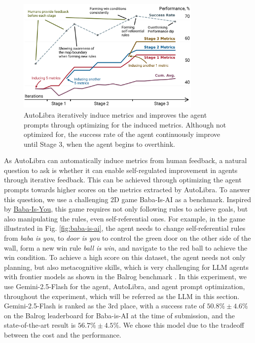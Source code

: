 \documentclass[../main.tex]{subfiles}
\begin{document}

\begin{figure}[!b]
	\centering
	\includegraphics[width=0.8\textwidth]{figs/running_maximum_plot.pdf}
	\caption{AutoLibra iteratively induce metrics and improves the agent prompts
	through optimizing for the induced metrics. Although not optimized for, the
	success rate of the agent continuously improve until Stage 3, when the agent begins
	to overthink.}
	\label{fig:autolibra_self_improving}
\end{figure}

As AutoLibra can automatically induce metrics from human feedback, a natural
question to ask is whether it can enable self-regulated improvement in agents
through iterative feedback. This can be achieved through optimizing the agent prompts
towards higher scores on the metrics extracted by AutoLibra. To answer this
question, we use a challenging 2D game Baba-Is-AI \citep{cloos2024babaaibreakrules, paglieri2024balrog}
as a benchmark. Inspired by \href{https://hempuli.com/baba/}{Baba-Is-You}, this
game requires not only following rules to achieve goals, but also manipulating the
rules, even self-referential ones. For example, in the game illustrated in Fig.
\ref{fig:baba-is-ai}, the agent needs to change self-referential rules from \textsl{baba
is you}, to \textsl{door is you} to control the green door on the other side of
the wall, form a new win rule \textsl{ball is win}, and navigate to the red ball
to achieve the win condition. To achieve a high score on this dataset, the agent
needs not only planning, but also metacognitive skills, which is very challenging
for LLM agents with frontier models as shown in the Balrog benchmark \citep{paglieri2024balrog}.
In this experiment, we use Gemini-2.5-Flash \citep{geminiteam2025geminifamilyhighlycapable}
for the agent, AutoLibra, and agent prompt optimization, throughout the
experiment, which will be referred as the LLM in this section. Gemini-2.5-Flash
is ranked as the 3rd place, with a success rate of $50.8\%\pm 4.6\%$ on the Balrog
leaderboard for Baba-is-AI at the time of submission, and the state-of-the-art
result is $56.7\%\pm4.5\%$. We chose this model due to the tradeoff between the cost and
the performance. 
\end{document}
